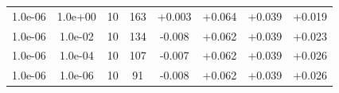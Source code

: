 \documentclass[11pt,a4paper]{article}
\begin{document}
\begin{table}
{\begin{tabular}{*{8}c}
 1.0e-06 	 & 1.0e+00 	 & 10 & 163 	 & +0.003 & +0.064 & +0.039 & +0.019 \\ 
 1.0e-06 	 & 1.0e-02 	 & 10 & 134 	 & -0.008 & +0.062 & +0.039 & +0.023 \\ 
 1.0e-06 	 & 1.0e-04 	 & 10 & 107 	 & -0.007 & +0.062 & +0.039 & +0.026 \\ 
 1.0e-06 	 & 1.0e-06 	 & 10 & 91 	 & -0.008 & +0.062 & +0.039 & +0.026 \\  
\end{tabular}}
\label{Tab::1}
\end{table} 
\end{document}
